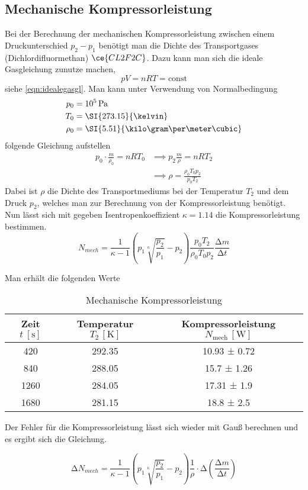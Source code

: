 \subsection{Mechanische Kompressorleistung}
Bei der Berechnung der mechanischen Kompressorleistung zwischen einem Druckunterschied $p_{2} - p_{1}$ benötigt man die Dichte des Transportgases (Dichlordifluormethan) $\ce{CL2F2C}$.
Dazu kann man sich die ideale Gasgleichung zunutze machen,
\begin{equation}
pV = n R T = \text{const}
\end{equation}
siehe \eqref{eqn:idealegasgl}. Man kann unter Verwendung von Normalbedingung
\begin{align}
p_{0} &= 10^{5} \, \text{Pa} \\
T_{0} &= \SI{273.15}{\kelvin} \\
\rho_{0} &= \SI{5.51}{\kilo\gram\per\meter\cubic}
\end{align}
folgende Gleichung aufstellen
\begin{align}
p_{0} \cdot \frac{m}{\rho_{0}} = nR T_{0} &\implies p_{2} \frac{m}{\rho} = nR T_{2} \\
&\implies \rho = \frac{\rho_{0}T_{0}p_{2}}{p_{0}T_{2}}
\end{align}
Dabei ist $\rho$ die Dichte des Transportmediums bei der Temperatur $T_{2}$ und dem Druck $p_{2}$, welches man zur Berechnung von der Kompressorleistung benötigt.
Nun lässt sich mit gegeben Isentropenkoeffizient $\kappa = 1.14$ die Kompressorleistung bestimmen.
\begin{equation}
N_{mech} = \frac{1}{\kappa - 1} \left( p_{1}\sqrt[\kappa]{\frac{p_{2}}{p_{1}}} - p_{2} \right) \frac{p_{0}T_{2}}{\rho_{0}T_{0}p_{2}} \frac{\increment m}{\increment t}
\end{equation}
\begin{flushleft}
Man erhält die folgenden Werte
\end{flushleft}
\begin{table}
  \centering
  \caption{Mechanische Kompressorleistung}
  \label{tab:mechkompr}
  \begin{tabular}{c c c}
    \toprule
    Zeit {$t \: [\si{\second}]$} & Temperatur $T_{2} \, [\si{\kelvin}]$ & Kompressorleistung $N_\text{mech} \, [\si{\watt}]$ \\
    \midrule
    420  & 292.35 & 10.93 ± 0.72 \\
    840  & 288.05 & 15.7 ± 1.26 \\
    1260  &  284.05 & 17.31 ± 1.9 \\
    1680 &  281.15 & 18.8 ± 2.5\\
    \bottomrule
  \end{tabular}
\end{table}
\begin{flushleft}
Der Fehler für die Kompressorleistung lässt sich wieder mit Gauß berechnen und es ergibt sich die Gleichung.
\end{flushleft}
\begin{equation}
  \increment N_{mech} = \frac{1}{\kappa - 1} \left( p_{1}\sqrt[\kappa]{\frac{p_{2}}{p_{1}}} - p_{2} \right) \frac{1}{\rho} \cdot \increment \left( \frac{\increment m}{\increment t} \right)
\end{equation}
